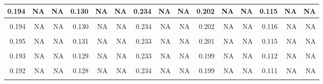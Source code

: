 \documentclass[]{article}
\begin{document}
\begin{table}[H]
{\begin{tabular}[t]{r|r|r|r|r|r|r|r|r|r|r|r|r|r|r}
\hline
0.194 & NA & NA & 0.130 & NA & NA & 0.234 & NA & NA & 0.202 & NA & NA & 0.115 & NA & \vphantom{1} NA\\
\hline
\cellcolor{gray!6}{0.194} & \cellcolor{gray!6}{NA} & \cellcolor{gray!6}{NA} & \cellcolor{gray!6}{0.130} & \cellcolor{gray!6}{NA} & \cellcolor{gray!6}{NA} & \cellcolor{gray!6}{0.234} & \cellcolor{gray!6}{NA} & \cellcolor{gray!6}{NA} & \cellcolor{gray!6}{0.202} & \cellcolor{gray!6}{NA} & \cellcolor{gray!6}{NA} & \cellcolor{gray!6}{0.115} & \cellcolor{gray!6}{NA} & \cellcolor{gray!6}{NA}\\
\hline
0.194 & NA & NA & 0.130 & NA & NA & 0.234 & NA & NA & 0.202 & NA & NA & 0.116 & NA & NA\\
\hline
\cellcolor{gray!6}{0.195} & \cellcolor{gray!6}{NA} & \cellcolor{gray!6}{NA} & \cellcolor{gray!6}{0.131} & \cellcolor{gray!6}{NA} & \cellcolor{gray!6}{NA} & \cellcolor{gray!6}{0.234} & \cellcolor{gray!6}{NA} & \cellcolor{gray!6}{NA} & \cellcolor{gray!6}{0.202} & \cellcolor{gray!6}{NA} & \cellcolor{gray!6}{NA} & \cellcolor{gray!6}{0.116} & \cellcolor{gray!6}{NA} & \cellcolor{gray!6}{NA}\\
\hline
0.195 & NA & NA & 0.131 & NA & NA & 0.233 & NA & NA & 0.201 & NA & NA & 0.115 & NA & NA\\
\hline
\cellcolor{gray!6}{0.194} & \cellcolor{gray!6}{NA} & \cellcolor{gray!6}{NA} & \cellcolor{gray!6}{0.130} & \cellcolor{gray!6}{NA} & \cellcolor{gray!6}{NA} & \cellcolor{gray!6}{0.233} & \cellcolor{gray!6}{NA} & \cellcolor{gray!6}{NA} & \cellcolor{gray!6}{0.200} & \cellcolor{gray!6}{NA} & \cellcolor{gray!6}{NA} & \cellcolor{gray!6}{0.114} & \cellcolor{gray!6}{NA} & \cellcolor{gray!6}{NA}\\
\hline
0.193 & NA & NA & 0.129 & NA & NA & 0.233 & NA & NA & 0.199 & NA & NA & 0.112 & NA & NA\\
\hline
\cellcolor{gray!6}{0.192} & \cellcolor{gray!6}{NA} & \cellcolor{gray!6}{NA} & \cellcolor{gray!6}{0.129} & \cellcolor{gray!6}{NA} & \cellcolor{gray!6}{NA} & \cellcolor{gray!6}{0.234} & \cellcolor{gray!6}{NA} & \cellcolor{gray!6}{NA} & \cellcolor{gray!6}{0.199} & \cellcolor{gray!6}{NA} & \cellcolor{gray!6}{NA} & \cellcolor{gray!6}{0.111} & \cellcolor{gray!6}{NA} & \cellcolor{gray!6}{NA}\\
\hline
0.192 & NA & NA & 0.128 & NA & NA & 0.234 & NA & NA & 0.199 & NA & NA & 0.111 & NA & NA\\
\hline
\cellcolor{gray!6}{0.191} & \cellcolor{gray!6}{NA} & \cellcolor{gray!6}{NA} & \cellcolor{gray!6}{0.128} & \cellcolor{gray!6}{NA} & \cellcolor{gray!6}{NA} & \cellcolor{gray!6}{0.234} & \cellcolor{gray!6}{NA} & \cellcolor{gray!6}{NA} & \cellcolor{gray!6}{0.198} & \cellcolor{gray!6}{NA} & \cellcolor{gray!6}{NA} & \cellcolor{gray!6}{0.110} & \cellcolor{gray!6}{NA} & \cellcolor{gray!6}{NA}\\

\end{tabular}}
\end{table}
\end{document}
